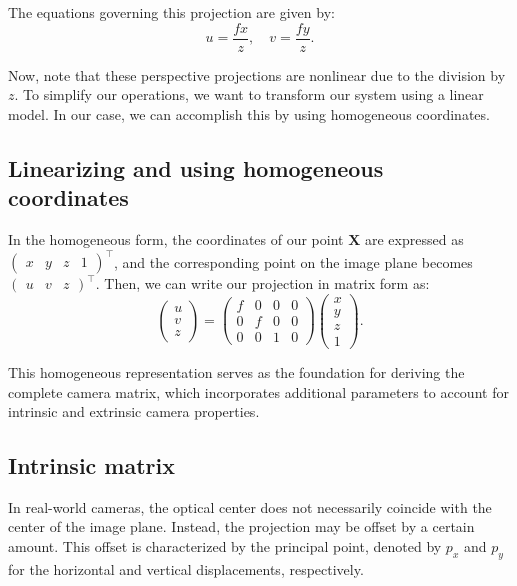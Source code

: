\documentclass[12pt]{article}
\begin{document}
The equations governing this projection are given by:
$$
u = \frac{f x}{z}, \quad v = \frac{f y}{z}.
$$

Now, note that these perspective projections are nonlinear due to the division by $z$. To simplify our operations, we want to transform our system using a linear model. In our case, we can accomplish this by using homogeneous coordinates.

\subsection{Linearizing and using homogeneous coordinates}

In the homogeneous form, the coordinates of our point $\mathbf{X}$ are expressed as $\begin{pmatrix} x & y & z & 1 \end{pmatrix}^\top$, and the corresponding point on the image plane becomes $\begin{pmatrix} u & v & z \end{pmatrix}^\top$. Then, we can write our projection in matrix form as:
$$
\begin{pmatrix} u \\ v \\ z \end{pmatrix} = 
\begin{pmatrix}
    f & 0 & 0 & 0 \\
    0 & f & 0 & 0 \\
    0 & 0 & 1 & 0
\end{pmatrix}
\begin{pmatrix} x \\ y \\ z \\ 1 \end{pmatrix}.
$$

This homogeneous representation serves as the foundation for deriving the complete camera matrix, which incorporates additional parameters to account for intrinsic and extrinsic camera properties.

\subsection{Intrinsic matrix}

In real-world cameras, the optical center does not necessarily coincide with the center of the image plane. Instead, the projection may be offset by a certain amount. This offset is characterized by the principal point, denoted by $p_x$ and $p_y$ for the horizontal and vertical displacements, respectively.
\end{document}
